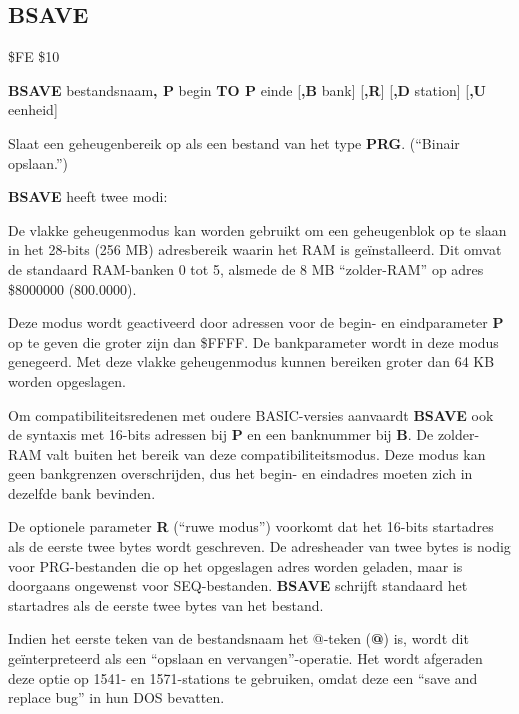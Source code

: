 \subsection{BSAVE}
\begin{description}[leftmargin=2cm,style=nextline]
\item [Token:]    \$FE \$10

\item [Formaat:]   {\bf BSAVE} bestandsnaam{\bf, P} begin {\bf TO P} einde [{\bf,B} bank] [{\bf,R}] [{\bf,D} station] [{\bf,U} eenheid]

\item [Gebruik:]    Slaat een geheugenbereik op als een bestand van het type {\bf PRG}. (``Binair opslaan.'')

                  {\bf BSAVE} heeft twee modi:

                  De vlakke geheugenmodus kan worden gebruikt om een geheugenblok op te slaan in het 28-bits (256 MB) adresbereik waarin het RAM is geïnstalleerd. Dit omvat de standaard RAM-banken 0 tot 5, alsmede de 8 MB ``zolder-RAM'' op adres \$8000000 (800.0000).

                  Deze modus wordt geactiveerd door adressen voor de begin- en eindparameter {\bf P} op te geven die groter zijn dan \$FFFF. De bankparameter wordt in deze modus genegeerd. Met deze vlakke geheugenmodus kunnen bereiken groter dan 64 KB worden opgeslagen.

                  Om compatibiliteitsredenen met oudere BASIC-versies aanvaardt {\bf BSAVE} ook de syntaxis met 16-bits adressen bij {\bf P} en een banknummer bij {\bf B}. De zolder-RAM valt buiten het bereik van deze compatibiliteitsmodus. Deze modus kan geen bankgrenzen overschrijden, dus het begin- en eindadres moeten zich in dezelfde bank bevinden.

                  De optionele parameter {\bf R} (``ruwe modus'') voorkomt dat het 16-bits startadres als de eerste twee bytes wordt geschreven. De adresheader van twee bytes is nodig voor PRG-bestanden die op het opgeslagen adres worden geladen, maar is doorgaans ongewenst voor SEQ-bestanden. {\bf BSAVE} schrijft standaard het startadres als de eerste twee bytes van het bestand.

                  \filenamedefinition

                  Indien het eerste teken van de bestandsnaam het @-teken ({\bf @}) is, wordt dit geïnterpreteerd als een ``opslaan en vervangen''-operatie. Het wordt afgeraden deze optie op 1541- en 1571-stations te gebruiken, omdat deze een ``save and replace bug'' in hun DOS bevatten.


\end{description}
